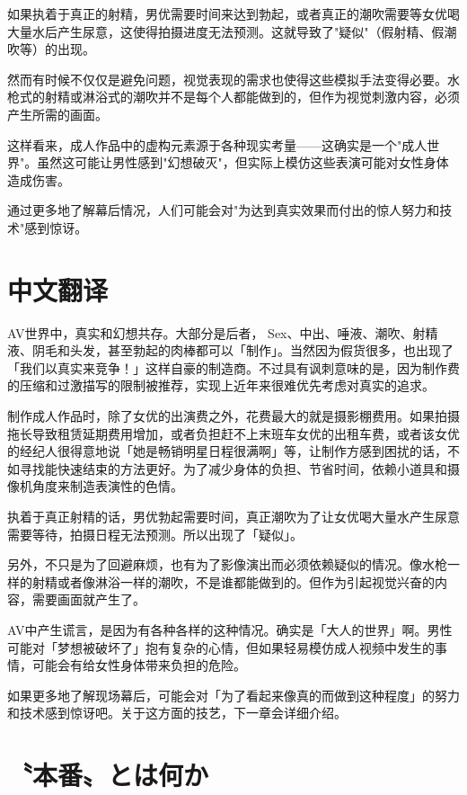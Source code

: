 \documentclass[12pt,UTF8]{ctexbook}
\begin{document}
如果执着于真正的射精，男优需要时间来达到勃起，或者真正的潮吹需要等女优喝大量水后产生尿意，这使得拍摄进度无法预测。这就导致了"疑似"（假射精、假潮吹等）的出现。

然而有时候不仅仅是避免问题，视觉表现的需求也使得这些模拟手法变得必要。水枪式的射精或淋浴式的潮吹并不是每个人都能做到的，但作为视觉刺激内容，必须产生所需的画面。

这样看来，成人作品中的虚构元素源于各种现实考量——这确实是一个"成人世界"。虽然这可能让男性感到"幻想破灭"，但实际上模仿这些表演可能对女性身体造成伤害。

通过更多地了解幕后情况，人们可能会对"为达到真实效果而付出的惊人努力和技术"感到惊讶。

\switchcolumn

\section*{中文翻译}

AV世界中，真实和幻想共存。大部分是后者， Sex、中出、唾液、潮吹、射精液、阴毛和头发，甚至勃起的肉棒都可以「制作」。当然因为假货很多，也出现了「我们以真实来竞争！」这样自豪的制造商。不过具有讽刺意味的是，因为制作费的压缩和过激描写的限制被推荐，实现上近年来很难优先考虑对真实的追求。

制作成人作品时，除了女优的出演费之外，花费最大的就是摄影棚费用。如果拍摄拖长导致租赁延期费用增加，或者负担赶不上末班车女优的出租车费，或者该女优的经纪人很得意地说「她是畅销明星日程很满啊」等，让制作方感到困扰的话，不如寻找能快速结束的方法更好。为了减少身体的负担、节省时间，依赖小道具和摄像机角度来制造表演性的色情。

执着于真正射精的话，男优勃起需要时间，真正潮吹为了让女优喝大量水产生尿意需要等待，拍摄日程无法预测。所以出现了「疑似」。

另外，不只是为了回避麻烦，也有为了影像演出而必须依赖疑似的情况。像水枪一样的射精或者像淋浴一样的潮吹，不是谁都能做到的。但作为引起视觉兴奋的内容，需要画面就产生了。

AV中产生谎言，是因为有各种各样的这种情况。确实是「大人的世界」啊。男性可能对「梦想被破坏了」抱有复杂的心情，但如果轻易模仿成人视频中发生的事情，可能会有给女性身体带来负担的危险。

如果更多地了解现场幕后，可能会对「为了看起来像真的而做到这种程度」的努力和技术感到惊讶吧。关于这方面的技艺，下一章会详细介绍。

\switchcolumn

\section{〝本番〟とは何か}
\end{document}
